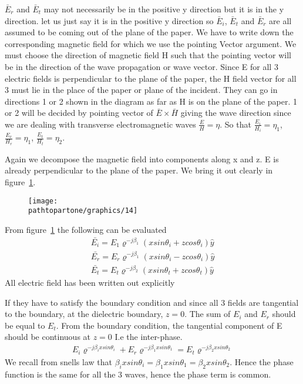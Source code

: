 $\bar{E}_{r}$ and  $\bar{E}_{t}$ may not necessarily be in the positive y direction but it is in the y direction. let us just say it is in the positive y direction so  $\bar{E}_{i}$,  $\bar{E}_{t}$ and  $\bar{E}_{r}$ are all assumed to be coming out of the plane of the paper. We have to write down the corresponding magnetic field for which we use the pointing Vector argument. We must choose the direction of magnetic field H such that the pointing vector will be in the direction of the wave propagation or wave vector. Since E for all 3 electric fields is perpendicular to the plane of the paper, the H field vector for all 3 must lie in the place of the paper or plane of the incident. They can go in directions 1 or 2 shown in the diagram as far as H is on the plane of the paper. 1 or 2 will be decided by pointing vector of  $\bar{E} \times \bar{H}$ giving the wave direction since we are dealing with transverse electromagnetic waves $\frac{E}{H} = \eta$. So that $\frac{E_{i}}{H_{i}} = \eta_{1}$, $\frac{E_{r}}{H_{r}} = \eta_{1}$, $\frac{E_{t}}{H_{t}} = \eta_{2}$.

Again we decompose the magnetic field into components along x and z. E is already perpendicular to the plane of the paper. We bring it out clearly in figure~\ref{fig:14}.
\begin{figure}[h]
\centering
\texttt{[image: \\pathtopartone/graphics/14]}
\caption{}
\label{fig:14}
\end{figure}

From figure~\ref{fig:14} the following can be evaluated
\begin{align*}
\bar{E_{i}} = E_{1} \varrho^{-j\beta_{1}} (x sin\theta_{i} + z cos\theta_{i}) \hat{y}\\
\bar{E_{r}} = E_{r}  \varrho^{-j\beta_{1}} (x sin\theta_{i} - z cos\theta_{i}) \hat{y}\\
\bar{E_{t}} = E_{t} \varrho^{-j\beta_{2}} (x sin\theta_{t} + z cos\theta_{t}) \hat{y}
\end{align*}
All electric field has been written out explicitly 

If they have to satisfy the boundary condition and since all 3 fields are tangential to the boundary, at the dielectric boundary, $z=0$. The sum of $E_i$ and $E_r$ should be equal to $E_{t}$. From the boundary condition, the tangential component of E should be continuous at $z=0$ I.e the inter-phase.
\begin{align*}
E_{i} \varrho^{-j \beta_{i} x sin\theta_{i}} + E_{r} \varrho^{-j \beta_{1} x sin\theta_{1}} = E_{t} \varrho^{-j \beta_{2} x sin\theta_{2}}
\end{align*}
We recall from snells law that $\beta_{i} x sin\theta_{i} = \beta_{1} x sin\theta_{1} = \beta_{2} x sin\theta_{2}$. Hence the phase function is the same for all the 3 waves, hence the phase term is common.

